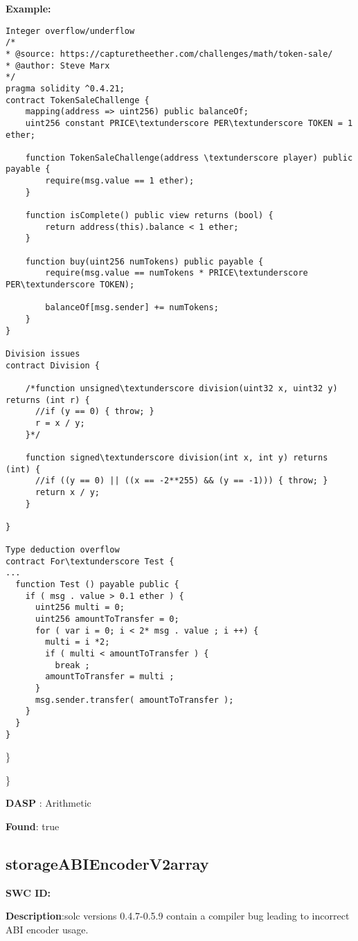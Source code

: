 \documentclass{article}
\begin{document}
\textbf{Example:} 
\begin{verbatim}
Integer overflow/underflow
/*
* @source: https://capturetheether.com/challenges/math/token-sale/
* @author: Steve Marx
*/
pragma solidity ^0.4.21;
contract TokenSaleChallenge {
    mapping(address => uint256) public balanceOf;
    uint256 constant PRICE\textunderscore PER\textunderscore TOKEN = 1 ether;

    function TokenSaleChallenge(address \textunderscore player) public payable {
        require(msg.value == 1 ether);
    }

    function isComplete() public view returns (bool) {
        return address(this).balance < 1 ether;
    }

    function buy(uint256 numTokens) public payable {
        require(msg.value == numTokens * PRICE\textunderscore PER\textunderscore TOKEN);

        balanceOf[msg.sender] += numTokens;
    }
}

Division issues
contract Division {

    /*function unsigned\textunderscore division(uint32 x, uint32 y) returns (int r) {
      //if (y == 0) { throw; }
      r = x / y;
    }*/

    function signed\textunderscore division(int x, int y) returns (int) {
      //if ((y == 0) || ((x == -2**255) && (y == -1))) { throw; }
      return x / y;
    }

}

Type deduction overflow
contract For\textunderscore Test {
...
  function Test () payable public {
    if ( msg . value > 0.1 ether ) {
      uint256 multi = 0;
      uint256 amountToTransfer = 0;
      for ( var i = 0; i < 2* msg . value ; i ++) {
        multi = i *2;
        if ( multi < amountToTransfer ) {
          break ;
        amountToTransfer = multi ;
      }
      msg.sender.transfer( amountToTransfer );
    }
  }
}

\end{verbatim}\} 

\} 

\textbf{DASP} : Arithmetic

\textbf{Found}: true

\subsection{storage\textunderscore ABIEncoderV2\textunderscore array} 
\textbf{SWC \textunderscore ID:} 

\textbf{Description}:solc versions 0.4.7-0.5.9 contain a compiler bug leading to incorrect ABI encoder usage.
\end{document}
